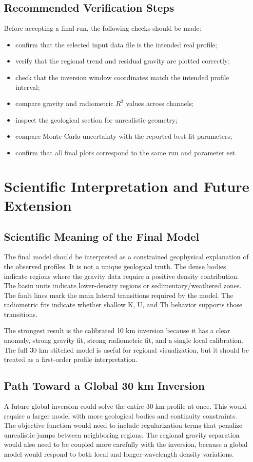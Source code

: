 \documentclass[12pt,a4paper]{article}
\begin{document}
\subsection{Recommended Verification Steps}
Before accepting a final run, the following checks should be made:
\begin{itemize}
    \item confirm that the selected input data file is the intended real profile;
    \item verify that the regional trend and residual gravity are plotted correctly;
    \item check that the inversion window coordinates match the intended profile interval;
    \item compare gravity and radiometric $R^2$ values across channels;
    \item inspect the geological section for unrealistic geometry;
    \item compare Monte Carlo uncertainty with the reported best-fit parameters;
    \item confirm that all final plots correspond to the same run and parameter set.
\end{itemize}

\section{Scientific Interpretation and Future Extension}
\subsection{Scientific Meaning of the Final Model}
The final model should be interpreted as a constrained geophysical explanation of the observed profiles. It is not a unique geological truth. The dense bodies indicate regions where the gravity data require a positive density contribution. The basin units indicate lower-density regions or sedimentary/weathered zones. The fault lines mark the main lateral transitions required by the model. The radiometric fits indicate whether shallow K, U, and Th behavior supports those transitions.

The strongest result is the calibrated 10 km inversion because it has a clear anomaly, strong gravity fit, strong radiometric fit, and a single local calibration. The full 30 km stitched model is useful for regional visualization, but it should be treated as a first-order profile interpretation.

\subsection{Path Toward a Global 30 km Inversion}
A future global inversion could solve the entire 30 km profile at once. This would require a larger model with more geological bodies and continuity constraints. The objective function would need to include regularization terms that penalize unrealistic jumps between neighboring regions. The regional gravity separation would also need to be coupled more carefully with the inversion, because a global model would respond to both local and longer-wavelength density variations.
\end{document}
